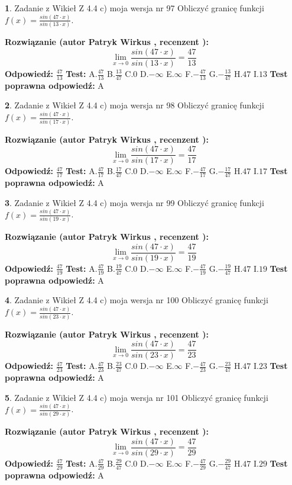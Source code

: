 \documentclass[12pt, a4paper]{article}
\theoremstyle{definition} %
\newtheorem{zad}{}
\newcommand{\zadStart}[1]{\begin{zad}#1\newline}
\newcommand{\zadStop}{\end{zad}}
\newcommand{\rozwStart}[2]{\noindent \textbf{Rozwiązanie (autor #1 , recenzent #2): }\newline}
\newcommand{\rozwStop}{\newline}
\newcommand{\odpStart}{\noindent \textbf{Odpowiedź:}\newline}
\newcommand{\odpStop}{\newline}
\newcommand{\testStart}{\noindent \textbf{Test:}\newline}
\newcommand{\testStop}{\newline}
\newcommand{\kluczStart}{\noindent \textbf{Test poprawna odpowiedź:}\newline}
\newcommand{\kluczStop}{\newline}
\begin{document}
\zadStart{Zadanie z Wikieł Z 4.4 c) moja wersja nr 97}
Obliczyć granicę funkcji $f(x)=\frac{sin(47\cdot x)}{sin(13\cdot x)}$.
\zadStop
\rozwStart{Patryk Wirkus}{}
$$\lim\limits_{x\to 0}\frac{sin(47\cdot x)}{sin(13\cdot x)}=
\frac{47}{13}$$
\rozwStop
\odpStart
$\frac{47}{13}$
\odpStop
\testStart
A.$\frac{47}{13}$
B.$\frac{13}{47}$
C.$0$
D.$-\infty$
E.$\infty$
F.$-\frac{47}{13}$
G.$-\frac{13}{47}$
H.$47$
I.$13$
\testStop
\kluczStart
A
\kluczStop



\zadStart{Zadanie z Wikieł Z 4.4 c) moja wersja nr 98}
Obliczyć granicę funkcji $f(x)=\frac{sin(47\cdot x)}{sin(17\cdot x)}$.
\zadStop
\rozwStart{Patryk Wirkus}{}
$$\lim\limits_{x\to 0}\frac{sin(47\cdot x)}{sin(17\cdot x)}=
\frac{47}{17}$$
\rozwStop
\odpStart
$\frac{47}{17}$
\odpStop
\testStart
A.$\frac{47}{17}$
B.$\frac{17}{47}$
C.$0$
D.$-\infty$
E.$\infty$
F.$-\frac{47}{17}$
G.$-\frac{17}{47}$
H.$47$
I.$17$
\testStop
\kluczStart
A
\kluczStop



\zadStart{Zadanie z Wikieł Z 4.4 c) moja wersja nr 99}
Obliczyć granicę funkcji $f(x)=\frac{sin(47\cdot x)}{sin(19\cdot x)}$.
\zadStop
\rozwStart{Patryk Wirkus}{}
$$\lim\limits_{x\to 0}\frac{sin(47\cdot x)}{sin(19\cdot x)}=
\frac{47}{19}$$
\rozwStop
\odpStart
$\frac{47}{19}$
\odpStop
\testStart
A.$\frac{47}{19}$
B.$\frac{19}{47}$
C.$0$
D.$-\infty$
E.$\infty$
F.$-\frac{47}{19}$
G.$-\frac{19}{47}$
H.$47$
I.$19$
\testStop
\kluczStart
A
\kluczStop



\zadStart{Zadanie z Wikieł Z 4.4 c) moja wersja nr 100}
Obliczyć granicę funkcji $f(x)=\frac{sin(47\cdot x)}{sin(23\cdot x)}$.
\zadStop
\rozwStart{Patryk Wirkus}{}
$$\lim\limits_{x\to 0}\frac{sin(47\cdot x)}{sin(23\cdot x)}=
\frac{47}{23}$$
\rozwStop
\odpStart
$\frac{47}{23}$
\odpStop
\testStart
A.$\frac{47}{23}$
B.$\frac{23}{47}$
C.$0$
D.$-\infty$
E.$\infty$
F.$-\frac{47}{23}$
G.$-\frac{23}{47}$
H.$47$
I.$23$
\testStop
\kluczStart
A
\kluczStop



\zadStart{Zadanie z Wikieł Z 4.4 c) moja wersja nr 101}
Obliczyć granicę funkcji $f(x)=\frac{sin(47\cdot x)}{sin(29\cdot x)}$.
\zadStop
\rozwStart{Patryk Wirkus}{}
$$\lim\limits_{x\to 0}\frac{sin(47\cdot x)}{sin(29\cdot x)}=
\frac{47}{29}$$
\rozwStop
\odpStart
$\frac{47}{29}$
\odpStop
\testStart
A.$\frac{47}{29}$
B.$\frac{29}{47}$
C.$0$
D.$-\infty$
E.$\infty$
F.$-\frac{47}{29}$
G.$-\frac{29}{47}$
H.$47$
I.$29$
\testStop
\kluczStart
A
\kluczStop
\end{document}
